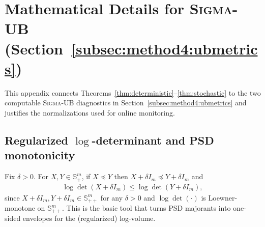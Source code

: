\documentclass{article}
\theoremstyle{plain}
\theoremstyle{definition}
\theoremstyle{remark}
\newcommand{\sgma}{\textsc{Sigma}\xspace}
\begin{document}


\section{Mathematical Details for \sgma-UB (Section~\ref{subsec:method4:ubmetrics})}
\label{app:sigma_ub}

This appendix connects Theorems~\ref{thm:deterministic}--\ref{thm:stochastic} to the two computable
\sgma-UB diagnostics in Section~\ref{subsec:method4:ubmetrics} and justifies the normalizations used for
online monitoring.

\subsection{Regularized \texorpdfstring{$\log$-determinant}{log-determinant} and PSD monotonicity}
Fix $\delta>0$. For $X,Y\in\mathbb{S}^m_{+}$, if $X\preceq Y$ then $X+\delta I_m\preceq Y+\delta I_m$ and
\begin{align}
\log\det(X+\delta I_m)\le \log\det(Y+\delta I_m),
\label{eq:app:psd_monotone}
\end{align}
since $X+\delta I_m,  Y+\delta I_m\in\mathbb{S}^m_{++}$ for any $\delta>0$ and $\log\det(\cdot)$ is Loewner-monotone on $\mathbb{S}^m_{++}$. This is the basic tool that turns PSD majorants into one-sided envelopes for the (regularized) log-volume.
\end{document}
